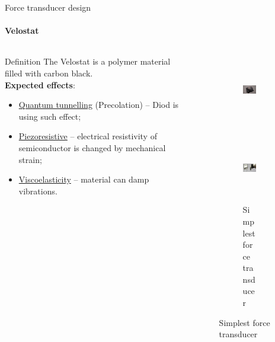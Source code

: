 \documentclass[aspectratio=169]{beamer}
\begin{document}
\begin{frame}[t]{Force transducer design}
    \framesubtitle{Velostat}
    \vspace{-20pt}
    \begin{columns}[T,onlytextwidth]
        \begin{column}{0.6\textwidth}
            \begin{exampleblock}{Definition}
                The Velostat is a polymer material filled with carbon black.\\
                \textbf{Expected effects}:
                \begin{itemize}
                    \item \underline{Quantum tunnelling} (Precolation) -- Diod is using such effect;
                    \item \underline{Piezoresistive} -- electrical resistivity of semiconductor is changed by mechanical strain;
                    \item \underline{Viscoelasticity} -- material can damp vibrations.
                \end{itemize}
            \end{exampleblock}
        \end{column}
        \begin{column}{0.38\textwidth}
            \vspace{-0.7cm}
            \begin{figure}[H]
                \begin{subfigure}{0.9\textwidth}
                    \centering\includegraphics[height=3cm,width=1\textwidth,keepaspectratio]{velostat_sensor.jpg}
                    \label{fig:velostat_sensor.jpg}
                \end{subfigure}

                \begin{subfigure}{0.9\textwidth}
                    \centering\includegraphics[height=3cm,width=1\textwidth,keepaspectratio]{simplest_sensor.jpg}
                    \caption*{Simplest force transducer}
                    \label{fig:simplest_sensor.jpg}
                \end{subfigure}
            \end{figure}
        \end{column}
    \end{columns}

\end{frame}
\end{document}

